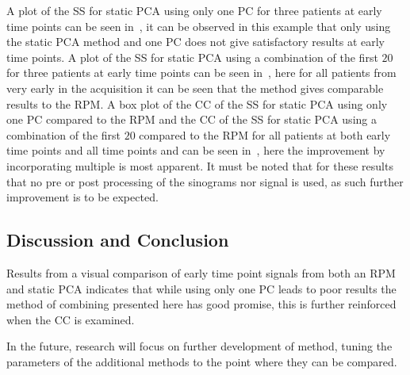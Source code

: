             A plot of the \gls{SS} for static \gls{PCA} using only one \gls{PC} for three patients at early time points can be seen in~, it can be observed in this example that only using the static \gls{PCA} method and one \gls{PC} does not give satisfactory results at early time points. A plot of the \gls{SS} for static \gls{PCA} using a combination of the first $20$  for three patients at early time points can be seen in~, here for all patients from very early in the acquisition it can be seen that the method gives comparable results to the \gls{RPM}. A box plot of the \gls{CC} of the \gls{SS} for static \gls{PCA} using only one \gls{PC} compared to the \gls{RPM} and the \gls{CC} of the \gls{SS} for static \gls{PCA} using a combination of the first $20$  compared to the \gls{RPM} for all patients at both early time points and all time points and  can be seen in~, here the improvement by incorporating multiple  is most apparent. It must be noted that for these results that no pre or post processing of the sinograms nor signal is used, as such further improvement is to be expected.
            
        \subsection{Discussion and Conclusion} \label{sec:pca_data_driven_surrogate_signal_extraction_methods_for_dynamic_pet_discussion_and_conclusion}
            Results from a visual comparison of early time point signals from both an \gls{RPM} and static \gls{PCA} indicates that while using only one \gls{PC} leads to poor results the method of combining  presented here has good promise, this is further reinforced when the \gls{CC} is examined.
            
            In the future, research will focus on further development of method, tuning the parameters of the additional methods to the point where they can be compared.
    
        
